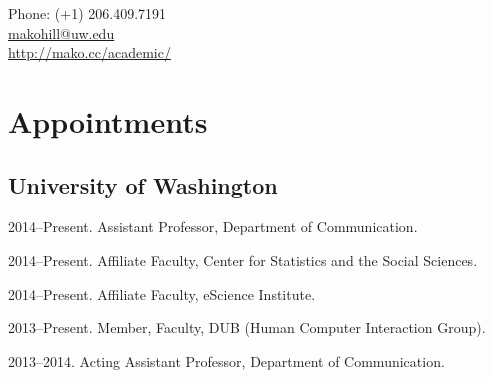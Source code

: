 \documentclass[10pt]{article}
\makeatletter
\def\myemail{makohill@uw.edu}
\def\myweb{http://mako.cc/academic/}
\newenvironment{cvlist}{
\begin{list}{}{\leftmargin=3.0em \itemindent=-3.0em}
  \setlength{\itemsep}{0pt}
  \setlength{\parskip}{0em}
  \setlength{\parsep}{1em}
  \setlength{\parindent}{0em}}
{\vspace{1em}
\end{list}}
\makeatother
\begin{document}
\pagestyle{fancy}
\renewcommand{\headrulewidth}{0pt}
\fancyhead{}
\fancyfoot{}
\rhead{{\scriptsize\thepage}}


\begin{minipage}[t]{3in}
  
\end{minipage}
\hfill     
\begin{minipage}[t]{0.0in}
\end{minipage}
\hfill
\begin{minipage}[t]{1.7in}
  \flushright \footnotesize Phone: (+1) 206.409.7191 \\ 
  \href{mailto:\myemail}{\myemail} \\
  \href{\myweb}{\myweb}
\end{minipage}

\vspace{2em}


\medskip

\section{Appointments}

\subsection{University of Washington}
\begin{cvlist}
\item 2014--Present. Assistant Professor, Department of Communication.
\item 2014--Present. Affiliate Faculty, Center for Statistics and the
  Social Sciences.
\item 2014--Present. Affiliate Faculty, eScience Institute.
\item 2013--Present. Member, Faculty, DUB (Human Computer Interaction Group).
\item 2013--2014. Acting Assistant Professor, Department of Communication.
\end{cvlist}
\end{document}
